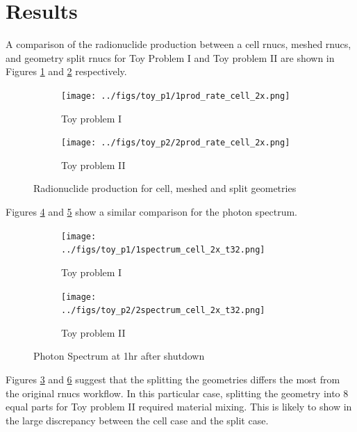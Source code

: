 \section{Results}

A comparison of the radionuclide production between a cell rnucs, meshed rnucs, and geometry split rnucs  for Toy Problem 
I and Toy problem II are shown 
in Figures \ref{1prod_cell_2x} and \ref{2prod_cell_2x} respectively. \\
\begin{figure}[h]
 \begin{centering}
 \centering
 \begin{subfigure}[b]{.45\textwidth}
 \texttt{[image: ../figs/toy\_p1/1prod\_rate\_cell\_2x.png]}
 \caption{Toy problem I }
 \label{1prod_cell_2x}
 \end{subfigure}
 \hspace{0.05cm}
 \begin{subfigure}[b]{.45\textwidth}
 \centering
 \texttt{[image: ../figs/toy\_p2/2prod\_rate\_cell\_2x.png]}
 \caption{Toy problem II}
 \label{2prod_cell_2x}
 \end{subfigure}
 \caption{Radionuclide production for cell, meshed and split geometries}
 \label{prod_cell_2x}
 \end{centering}
\end{figure}

Figures \ref{1spect_cell_2x} and \ref{2spect_cell_2x} show a similar comparison for the photon spectrum.  \\

\begin{figure}[h!]
 \begin{centering}
 \centering
 \begin{subfigure}[b]{.45\textwidth}
 \texttt{[image: ../figs/toy\_p1/1spectrum\_cell\_2x\_t32.png]}
 \caption{Toy problem I }
 \label{1spect_cell_2x}
 \end{subfigure}
 \hspace{0.05cm}
 \begin{subfigure}[b]{.45\textwidth}
 \centering
 \texttt{[image: ../figs/toy\_p2/2spectrum\_cell\_2x\_t32.png]}
 \caption{Toy problem II}
 \label{2spect_cell_2x}
 \end{subfigure}
 \caption{Photon Spectrum at 1hr after shutdown }
 \label{spect_cell_2x}
 \end{centering}
\end{figure}

Figures \ref{prod_cell_2x} and \ref{spect_cell_2x} suggest that the splitting the geometries 
differs the most from the original rnucs workflow. In this particular case, splitting the geometry 
into 8 equal parts for Toy problem II required material mixing. This is likely to show in the large 
discrepancy between the cell case and the split case. 


